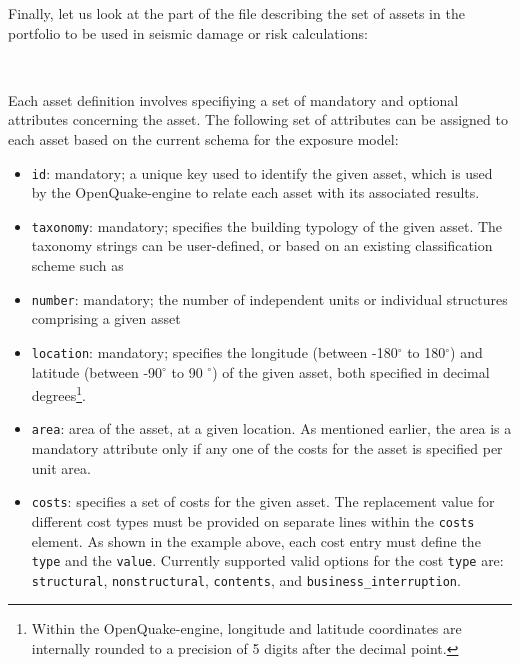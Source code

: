 Finally, let us look at the part of the file describing the set of assets in
the portfolio to be used in seismic damage or risk calculations:

\inputminted[firstline=17,firstnumber=17,lastline=27,fontsize=\footnotesize,frame=single,linenos,bgcolor=lightgray]{xml}{oqum/risk/Verbatim/input_exposure_minimal.xml}\\

Each asset definition involves specifiying a set of mandatory and optional
attributes concerning the asset. The following set of attributes can be
assigned to each asset based on the current schema for the exposure model:

\begin{itemize}

    \item \Verb+id+: mandatory; a unique key used to identify the given
    \gls{asset}, which is used by the OpenQuake-engine to relate each asset 
    with its associated results.

    \item \Verb+taxonomy+: mandatory; specifies the building typology of the 
    given \gls{asset}. The taxonomy strings can be user-defined, or based on
    an existing classification scheme such as 

    \item \Verb+number+: mandatory; the number of independent units or 
    individual structures comprising a given \gls{asset}

    \item \Verb+location+: mandatory; specifies the longitude 
    (between -180$^{\circ}$ to 180$^{\circ}$) and latitude 
    (between -90$^{\circ}$ to 90 $^{\circ}$) of the given \gls{asset}, both
    specified in decimal degrees\footnote{Within the OpenQuake-engine, 
    longitude and latitude coordinates are internally rounded to a precision
    of 5 digits after the decimal point.}.

    \item \Verb+area+: area of the \gls{asset}, at a given location. As 
    mentioned earlier, the area is a mandatory attribute only if any one of the 
    costs for the \gls{asset} is specified per unit area.

    \item \Verb+costs+: specifies a set of costs for the given \gls{asset}. 
    The replacement value for different cost types must be provided on 
    separate lines within the \Verb+costs+ element. As shown in the example 
    above, each cost entry must define the \Verb+type+ and the \Verb+value+. 
    Currently supported valid options for the cost \Verb+type+ are: 
    \Verb+structural+,  \Verb+nonstructural+, \Verb+contents+, and 
    \Verb+business_interruption+.


\end{itemize}
